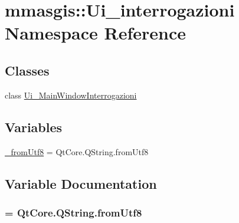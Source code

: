 \hypertarget{namespacemmasgis_1_1Ui__interrogazioni}{
\section{mmasgis::Ui\_\-interrogazioni Namespace Reference}
\label{namespacemmasgis_1_1Ui__interrogazioni}
}
\subsection*{Classes}
\begin{DoxyCompactItemize}
\item 
class \hyperlink{classmmasgis_1_1Ui__interrogazioni_1_1Ui__MainWindowInterrogazioni}{Ui\_\-MainWindowInterrogazioni}
\end{DoxyCompactItemize}
\subsection*{Variables}
\begin{DoxyCompactItemize}
\item 
\hyperlink{namespacemmasgis_1_1Ui__interrogazioni_abb42596141f3bf8a8f29f856b380261a}{\_\-fromUtf8} = QtCore.QString.fromUtf8
\end{DoxyCompactItemize}


\subsection{Variable Documentation}
\hypertarget{namespacemmasgis_1_1Ui__interrogazioni_abb42596141f3bf8a8f29f856b380261a}{
\subsubsection[{\_\-fromUtf8}]{ = QtCore.QString.fromUtf8}}
\label{namespacemmasgis_1_1Ui__interrogazioni_abb42596141f3bf8a8f29f856b380261a}
